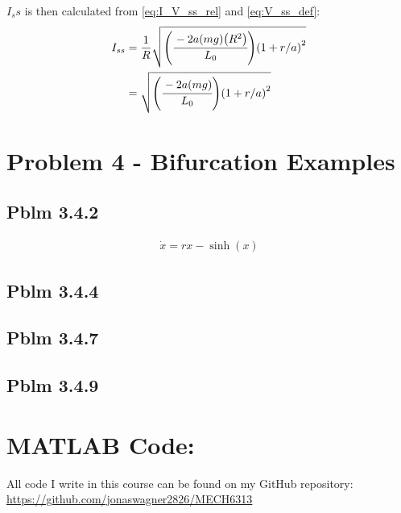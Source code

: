\documentclass[letter]{article}
\begin{document}
$I_ss$ is then calculated from \eqref{eq:I_V_ss_rel} and \eqref{eq:V_ss_def}:
\begin{align}
	I_{ss}	&= \frac{1}{R} \sqrt{\qty(\cfrac{-2 a \qty(mg) \qty(R^2)}{L_0}) \qty(1+r/a)^2} \nonumber \\
			&= \sqrt{\qty(\cfrac{-2 a \qty(mg)}{L_0}) \qty(1+r/a)^2} \label{eq:I_ss_def}
\end{align}



\newpage
\section{Problem 4 - Bifurcation Examples}

\subsection{Pblm 3.4.2}

\begin{align*}
	\dot{x} = r x - \sinh(x)
\end{align*}





\subsection{Pblm 3.4.4}




\subsection{Pblm 3.4.7}




\subsection{Pblm 3.4.9}


\newpage
\appendix
\section{MATLAB Code:}
All code I write in this course can be found on my GitHub repository:\\
\href{https://github.com/jonaswagner2826/MECH6313}{https://github.com/jonaswagner2826/MECH6313}

\end{document}
